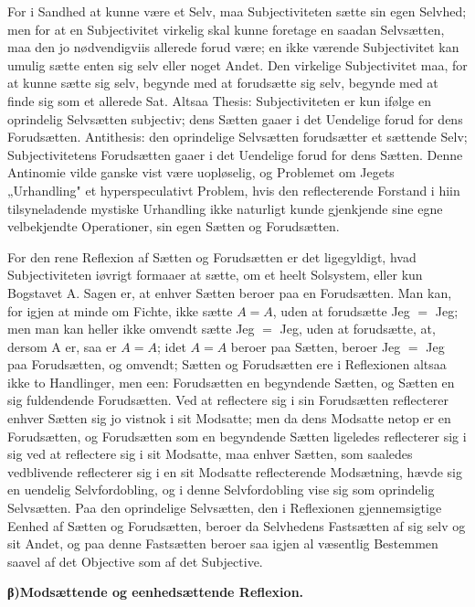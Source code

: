 \documentclass[12pt]{book}
\newcommand{\opage}[1]{\marginnote{\footnotesize\textit{[#1]}}}
\begin{document}
For i Sandhed at kunne være et Selv, maa Subjectiviteten sætte sin egen Selvhed;
men for at en Subjectivitet virkelig skal kunne foretage en saadan Selvsætten, maa
den jo nødvendigviis allerede forud være; en ikke værende Subjectivitet kan umulig
sætte enten sig selv eller noget Andet. Den virkelige Subjectivitet maa, for at
kunne sætte sig selv, begynde med at forudsætte sig selv, begynde med at finde sig
som et allerede Sat. Altsaa Thesis: Subjectiviteten er kun ifølge en oprindelig
Selvsætten subjectiv; dens Sætten gaaer i det Uendelige forud for dens Forudsætten.
Antithesis: den oprindelige Selvsætten forudsætter et sættende Selv;
Subjectivitetens Forudsætten gaaer i det Uendelige forud for dens Sætten. Denne
Antinomie vilde ganske vist være uopløselig, og Problemet om Jegets „Urhandling"
et hyperspeculativt Problem, hvis den reflecterende Forstand i hiin tilsyneladende
mystiske Urhandling ikke naturligt kunde gjenkjende sine egne velbekjendte
Operationer, sin egen Sætten og Forudsætten.

For den rene Reflexion af Sætten og Forudsætten er det ligegyldigt, hvad
Subjectiviteten iøvrigt formaaer at sætte, om et heelt Solsystem, eller kun
Bogstavet A. Sagen er, at enhver Sætten beroer paa en Forudsætten. Man kan, for
igjen at minde om Fichte, ikke sætte $A = A$, uden at forudsætte Jeg $=$ Jeg; men
man kan heller ikke omvendt sætte Jeg $=$ Jeg, uden at forudsætte, at, dersom A er,
saa er $A = A$; idet $A = A$ beroer paa Sætten, beroer Jeg $=$ Jeg paa
Forudsætten, og omvendt; Sætten og Forudsætten ere i Reflexionen altsaa ikke to
Handlinger, men een: Forudsætten en begyndende Sætten, og Sætten en sig fuldendende
Forudsætten. Ved at reflectere sig i sin Forudsætten reflecterer enhver Sætten sig
jo vistnok i sit Modsatte; men da dens
\opage{66} Modsatte netop er en Forudsætten, og Forudsætten som en begyndende Sætten ligeledes
reflecterer sig i sig ved at reflectere sig i sit Modsatte, maa enhver Sætten, som
saaledes vedblivende reflecterer sig i en sit Modsatte reflecterende Modsætning,
hævde sig en uendelig Selvfordobling, og i denne Selvfordobling vise sig som
oprindelig Selvsætten. Paa den oprindelige Selvsætten, den i Reflexionen
gjennemsigtige Eenhed af Sætten og Forudsætten, beroer da Selvhedens Fastsætten af
sig selv og sit Andet, og paa denne Fastsætten beroer saa igjen al væsentlig
Bestemmen saavel af det Objective som af det Subjective.

\begin{center}
{\bfseries β)\quad Modsættende og eenhedsættende Reflexion.}
\end{center}
\end{document}
